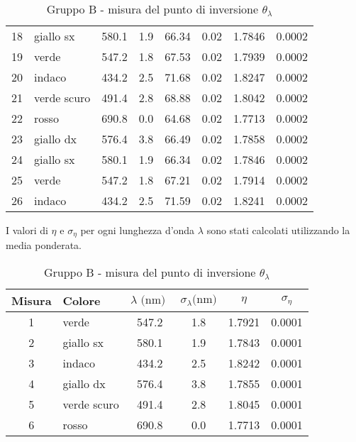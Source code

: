 \begin{table}[!htbp]
{\begin{tabular}{clcccrcc}
        18  &   giallo sx    &   580.1  & 1.9 &  66.34 &   0.02  & 1.7846 & 0.0002  \\
        19  &   verde        &   547.2  & 1.8 &  67.53 &   0.02  & 1.7939 & 0.0002  \\
        20  &   indaco       &   434.2  & 2.5 &  71.68 &   0.02  & 1.8247 & 0.0002  \\
        21  &   verde scuro  &   491.4  & 2.8 &  68.88 &   0.02  & 1.8042 & 0.0002  \\
        22  &   rosso        &   690.8  & 0.0 &  64.68 &   0.02  & 1.7713 & 0.0002  \\
        23  &   giallo dx    &   576.4  & 3.8 &  66.49 &   0.02  & 1.7858 & 0.0002  \\
        24  &   giallo sx    &   580.1  & 1.9 &  66.34 &   0.02  & 1.7846 & 0.0002  \\
        25  &   verde        &   547.2  & 1.8 &  67.21 &   0.02  & 1.7914 & 0.0002  \\
        26  &   indaco       &   434.2  & 2.5 &  71.59 &   0.02  & 1.8241 & 0.0002  \\
        \hline
    \end{tabular}
    \par}
    \caption{Gruppo B - misura del punto di inversione $\theta_{\lambda}$}
\end{table}

I valori di $\eta$ e $\sigma_{\eta}$ per ogni lunghezza d'onda $\lambda$ sono stati calcolati utilizzando la media ponderata.

\begin{table}[!htbp]
    {\par\centering
    \begin{tabular}{clcccc}
        \hline
            Misura &
            Colore & 
            $\lambda \text{ (nm) }$ &
            $\sigma_{\lambda} \text{(nm)}$ & 
            $\eta$ &
            $\sigma_{\eta}$ \\
        \hline
        1   &   verde        &   547.2  & 1.8 &  1.7921 &   0.0001 \\
        2   &   giallo sx    &   580.1  & 1.9 &  1.7843 &   0.0001 \\
        3   &   indaco       &   434.2  & 2.5 &  1.8242 &   0.0001 \\
        4   &   giallo dx    &   576.4  & 3.8 &  1.7855 &   0.0001 \\
        5   &   verde scuro  &   491.4  & 2.8 &  1.8045 &   0.0001 \\
        6   &   rosso        &   690.8  & 0.0 &  1.7713 &   0.0001 \\
        \hline
    \end{tabular}
    \par}
    \caption{Gruppo B - misura del punto di inversione $\theta_{\lambda}$}
\end{table}

